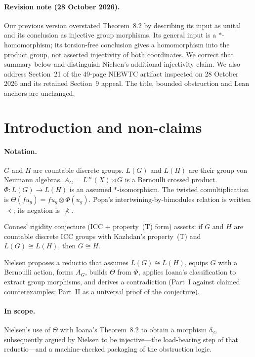 \documentclass[11pt]{article}
\begin{document}
\newpage
\paragraph{Revision note (28 October 2026).}
Our previous version overstated Theorem~8.2 by describing its input as unital
and its conclusion as injective group morphisms. Its general input is a
$*$-homomorphism; its torsion-free conclusion gives a homomorphism into the
product group, not asserted injectivity of both coordinates. We correct that
summary below and distinguish Nielsen's additional injectivity claim. We also
address Section~21 of the 49-page NIEWTC artifact inspected on 28 October 2026
and its retained Section~9 appeal. The title, bounded obstruction and Lean
anchors are unchanged.

\section{Introduction and non-claims}

\paragraph{Notation.}
$G$ and $H$ are countable discrete groups. $L(G)$ and $L(H)$ are their group
von Neumann algebras. $A_G=L^\infty(X)\rtimes G$ is a Bernoulli crossed product.
$\Phi\colon L(G)\to L(H)$ is an assumed $*$-isomorphism. The twisted
comultiplication is
$\Theta(f u_g)=f u_g\otimes\Phi(u_g)$.
Popa's intertwining-by-bimodules relation is written $\prec$; its negation is
$\nprec$.

Connes' rigidity conjecture (ICC + property~(T) form) asserts: if $G$ and $H$
are countable discrete ICC groups with Kazhdan's property~(T) and
$L(G)\cong L(H)$, then $G\cong H$.

Nielsen proposes a reductio that assumes $L(G)\cong L(H)$, equips $G$ with a
Bernoulli action, forms $A_G$, builds $\Theta$ from $\Phi$, applies Ioana's
classification to extract group morphisms, and derives a contradiction
(Part~I against claimed counterexamples; Part~II as a universal proof of the
conjecture).

\paragraph{In scope.}
Nielsen's use of $\Theta$ with Ioana's Theorem~8.2 to obtain a morphism
$\delta_2$, subsequently argued by Nielsen to be injective---the load-bearing
step of that reductio---and a
machine-checked packaging of the obstruction logic.
\end{document}
